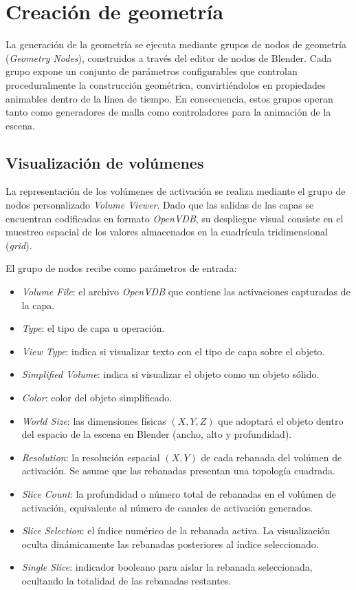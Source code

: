 \section{Creación de geometría}
La generación de la geometría se ejecuta mediante grupos de nodos de geometría 
(\textit{Geometry Nodes}), construidos a través del editor de nodos de Blender. 
Cada grupo expone un conjunto de parámetros configurables que controlan proceduralmente 
la construcción geométrica, convirtiéndolos en propiedades animables dentro de la línea de tiempo. 
En consecuencia, estos grupos operan tanto como generadores de malla como controladores para la 
animación de la escena.

\subsection{Visualización de volúmenes}
La representación de los volúmenes de activación se realiza mediante el grupo de nodos personalizado 
\textit{Volume Viewer}. Dado que las salidas de las capas se encuentran codificadas en formato 
\textit{OpenVDB}, su despliegue visual consiste en el muestreo espacial de los valores almacenados 
en la cuadrícula tridimensional (\textit{grid}).
\medskip

El grupo de nodos recibe como parámetros de entrada:
\begin{itemize}
    \item \textit{Volume File}: el archivo \textit{OpenVDB} que contiene las activaciones capturadas 
    de la capa.
    \item \textit{Type}: el tipo de capa u operación.
    \item \textit{View Type}: indica si visualizar texto con el tipo de capa sobre el objeto.
    \item \textit{Simplified Volume}: indica si visualizar el objeto como un objeto sólido.
    \item \textit{Color}: color del objeto simplificado.
    \item \textit{World Size}: las dimensiones físicas $(X, Y, Z)$ que adoptará el objeto dentro 
    del espacio de la escena en Blender (ancho, alto y profundidad).
    \item \textit{Resolution}: la resolución espacial $(X, Y)$ de cada rebanada del volúmen de activación. 
    Se asume que las rebanadas presentan una topología cuadrada.
    \item \textit{Slice Count}: la profundidad o número total de rebanadas en el volúmen de activación, equivalente 
    al número de canales de activación generados.
    \item \textit{Slice Selection}: el índice numérico de la rebanada activa. La visualización 
    oculta dinámicamente las rebanadas posteriores al índice seleccionado.
    \item \textit{Single Slice}: indicador booleano para aislar la rebanada seleccionada, 
    ocultando la totalidad de las rebanadas restantes.
\end{itemize}

